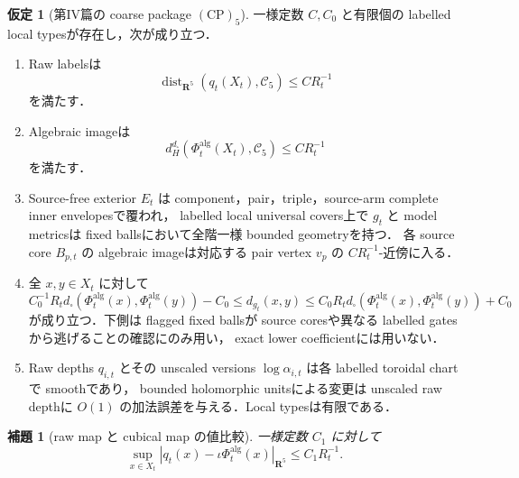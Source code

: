 \documentclass[a4paper,11pt]{ltjsarticle}
\numberwithin{equation}{section}
\theoremstyle{plain}
\newtheorem{lemma}[lemma]{補題}
\theoremstyle{definition}
\newtheorem{hypothesis}[hypothesis]{仮定}
\theoremstyle{remark}
\newcommand{\RR}{\mathbf R}
\newcommand{\cC}{\mathcal C}
\newcommand{\dist}{\operatorname{dist}}
\begin{document}
\begin{hypothesis}[第IV篇の coarse package $\mathrm{(CP)}_5$]\label{thm:partI-package}
一様定数 $C,C_0$ と有限個の labelled local typesが存在し，次が成り立つ．
\begin{enumerate}[label=\textup{(I\arabic*)}]
\item Raw labelsは
      \begin{equation}\label{eq:raw-near-C5}
       \dist_{\RR^5}(q_t(X_t),\cC_5)\le CR_t^{-1}
      \end{equation}
      を満たす．
\item Algebraic imageは
      \begin{equation}\label{eq:alg-image-density}
       d_H^{d_\square}(\Phi_t^{\mathrm{alg}}(X_t),\cC_5)\le CR_t^{-1}
      \end{equation}
      を満たす．
\item Source-free exterior $E_t$ は component，pair，triple，source-arm complete inner envelopesで覆われ，
      labelled local universal covers上で $g_t$ と model metricsは fixed ballsにおいて全階一様 bounded geometryを持つ．
      各 source core $B_{p,t}$ の algebraic imageは対応する pair vertex $v_p$ の $CR_t^{-1}$-近傍に入る．
\item 全 $x,y\in X_t$ に対して
      \begin{equation}\label{eq:coarse-distance}
       C_0^{-1}R_t d_\square(\Phi_t^{\mathrm{alg}}(x),\Phi_t^{\mathrm{alg}}(y))-C_0
       \le d_{g_t}(x,y)
       \le C_0R_t d_\square(\Phi_t^{\mathrm{alg}}(x),\Phi_t^{\mathrm{alg}}(y))+C_0
      \end{equation}
      が成り立つ．下側は flagged fixed ballsが source coresや異なる labelled gatesから逃げることの確認にのみ用い，
      exact lower coefficientには用いない．
\item Raw depths $q_{i,t}$ とその unscaled versions $\log\alpha_{i,t}$ は各 labelled toroidal chartで smoothであり，
      bounded holomorphic unitsによる変更は unscaled raw depthに $O(1)$ の加法誤差を与える．Local typesは有限である．
\end{enumerate}
\end{hypothesis}

\begin{lemma}[raw map と cubical map の値比較]\label{lem:raw-alg-value-close}
一様定数 $C_1$ に対して
\begin{equation}\label{eq:raw-alg-ambient-close}
 \sup_{x\in X_t}\left|q_t(x)-\iota\Phi_t^{\mathrm{alg}}(x)\right|_{\RR^5}\le C_1R_t^{-1}.
\end{equation}
\end{lemma}
\end{document}
